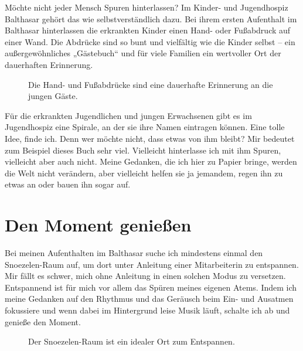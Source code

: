 \documentclass[fontsize=14pt,a4paper,headinclude,DIV=calc,automark]{scrbook}
\begin{document}
Möchte nicht jeder Mensch Spuren hinterlassen? Im Kinder- und Jugendhospiz Balthasar gehört das wie selbstverständlich dazu. Bei ihrem ersten Aufenthalt im Balthasar hinterlassen die erkrankten Kinder einen Hand- oder Fußabdruck auf einer Wand. Die Abdrücke sind so bunt und vielfältig wie die Kinder selbst – ein außergewöhnliches „Gästebuch“ und für viele Familien ein wertvoller Ort der dauerhaften Erinnerung.

\setlength{\fboxsep}{0pt}    %
\setlength{\fboxrule}{0.2pt} %
\begin{figure}[ht]
    \raggedright
    \caption{Die Hand- und Fußabdrücke sind eine dauerhafte Erinnerung an die jungen Gäste.}
    \label{fig:abdrücke}
\end{figure}

Für die erkrankten Jugendlichen und jungen Erwachsenen gibt es im Jugendhospiz eine Spirale, an der sie ihre Namen eintragen können. Eine tolle Idee, finde ich. Denn wer möchte nicht, dass etwas von ihm bleibt? Mir bedeutet zum Beispiel dieses Buch sehr viel. Vielleicht hinterlasse ich mit ihm Spuren, vielleicht aber auch nicht. Meine Gedanken, die ich hier zu Papier bringe, werden die Welt nicht verändern, aber vielleicht helfen sie ja jemandem, regen ihn zu etwas an oder bauen ihn sogar auf.

\section{Den Moment genießen}

Bei meinen Aufenthalten im Balthasar suche ich mindestens einmal den Snoezelen-Raum auf, um dort unter Anleitung einer Mitarbeiterin zu entspannen. Mir fällt es schwer, mich ohne Anleitung in einen solchen Modus zu versetzen. Entspannend ist für mich vor allem das Spüren meines eigenen Atems. Indem ich meine Gedanken auf den Rhythmus und das Geräusch beim Ein- und Ausatmen fokussiere und wenn dabei im Hintergrund leise Musik läuft, schalte ich ab und genieße den Moment.

\setlength{\fboxsep}{0pt}    %
\setlength{\fboxrule}{0.2pt} %
\begin{figure}[ht]
    \raggedright
    \caption{Der Snoezelen-Raum ist ein idealer Ort zum Entspannen.}
    \label{fig:abdrücke}
\end{figure}
\end{document}
